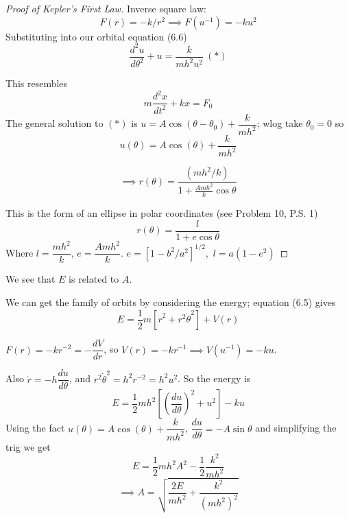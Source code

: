 \documentclass[twoside]{scrartcl}
\begin{document}
\begin{proof}[Proof of Kepler's First Law]
Inverse square law:
\[F(r) = -k/r^2 \implies F(u^{-1}) = -ku^2\]
Substituting into our orbital equation (6.6)
\[\frac{d^2u}{d\theta^2} + u = \frac{k}{mh^2u^2} ~(*)\]

This resembles \[m\frac{d^2x}{dt^2} + kx = F_0\]
The general solution to $(*)$ is $u = A\cos(\theta-\theta_0) + \dfrac{k}{mh^2}$;
 wlog take $\theta_0 = 0$ so
\[u(\theta) = A\cos(\theta) + \dfrac{k}{mh^2}\]

\begin{equation}\implies r(\theta) = \frac{(mh^2/k)}{1 + \frac{Amh^2}{k}\cos\theta}\end{equation}

This is the form of an ellipse in polar coordinates (see Problem 10, P.S. 1)
\[r(\theta) = \frac{l}{1 + e\cos\theta}\]
Where $l = \dfrac{mh^2}{k}$, $e = \dfrac{Amh^2}{k}$. $e = [1-b^2/a^2]^{1/2}$,~$l = a(1-e^2)$ \end{proof}

    \begin{center}
    \end{center}

We see that $E$ is related to $A$.
 
We can get the family of orbits by considering the energy; equation (6.5) gives
\[E = \frac{1}{2}m[\dot{r}^2 + r^2\dot{\theta}^2] + V(r)\]
 
 
 $F(r) =-kr^{-2} = -\dfrac{dV}{dr}$, so $ V(r) = -kr^{-1} \implies V(u^{-1}) = -ku$. 

Also $\dot{r} = -h\dfrac{du}{d\theta}$, and $r^2\dot{\theta}^2 = h^2r^{-2} = h^2u^2$. So the energy is
\[E = \frac{1}{2}mh^2\left[\left(\frac{du}{d\theta}\right)^2 + u^2\right]-ku\]
Using the fact $u(\theta) = A\cos(\theta) + \dfrac{k}{mh^2}$, $\dfrac{du}{d\theta} = -A\sin\theta$ and simplifying the trig we get
\[E = \frac{1}{2}mh^2A^2 - \frac{1}{2}\frac{k^2}{mh^2}\]
\[\implies A = \sqrt{\frac{2E}{mh^2} + \frac{k^2}{(mh^2)^2} }\]~
\end{document}
